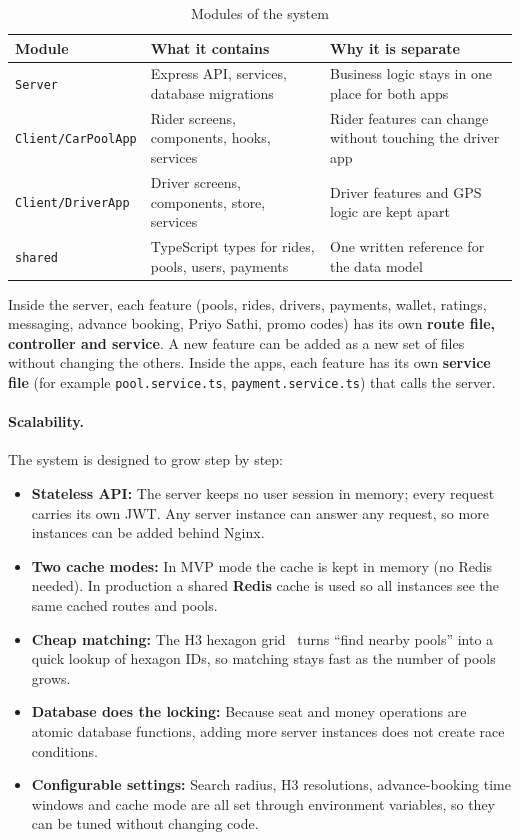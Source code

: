 \begin{table}[H]
  \centering
  \small
  \caption{Modules of the system}
  \label{tab:modules}
  \begin{tabularx}{\textwidth}{@{}p{3.2cm}LL@{}}
    \toprule
    \textbf{Module} & \textbf{What it contains} & \textbf{Why it is separate} \\
    \midrule
    \texttt{Server}             & Express API, services, database migrations & Business logic stays in one place for both apps \\
    \texttt{Client/CarPoolApp}  & Rider screens, components, hooks, services & Rider features can change without touching the driver app \\
    \texttt{Client/DriverApp}   & Driver screens, components, store, services & Driver features and GPS logic are kept apart \\
    \texttt{shared}             & TypeScript types for rides, pools, users, payments & One written reference for the data model \\
    \bottomrule
  \end{tabularx}
\end{table}

Inside the server, each feature (pools, rides, drivers, payments, wallet,
ratings, messaging, advance booking, Priyo Sathi, promo codes) has its own
\textbf{route file, controller and service}. A new feature can be added as a
new set of files without changing the others. Inside the apps, each feature has
its own \textbf{service file} (for example \texttt{pool.service.ts},
\texttt{payment.service.ts}) that calls the server.

\paragraph{Scalability.}
The system is designed to grow step by step:

\begin{itemize}
  \item \textbf{Stateless API:} The server keeps no user session in memory;
        every request carries its own JWT. Any server instance can answer any
        request, so more instances can be added behind Nginx.
  \item \textbf{Two cache modes:} In MVP mode the cache is kept in memory (no
        Redis needed). In production a shared \textbf{Redis} cache is used so
        all instances see the same cached routes and pools.
  \item \textbf{Cheap matching:} The H3 hexagon grid~\cite{h3} turns ``find
        nearby pools'' into a quick lookup of hexagon IDs, so matching stays
        fast as the number of pools grows.
  \item \textbf{Database does the locking:} Because seat and money operations
        are atomic database functions, adding more server instances does not
        create race conditions.
  \item \textbf{Configurable settings:} Search radius, H3 resolutions,
        advance-booking time windows and cache mode are all set through
        environment variables, so they can be tuned without changing code.
\end{itemize}

